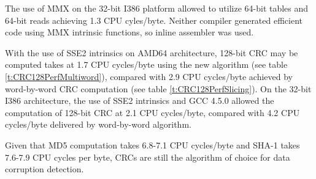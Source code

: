 \documentclass{article}
\begin{document}
The use of MMX on the 32-bit I386 platform allowed to utilize 64-bit tables
and 64-bit reads achieving 1.3 CPU cyles/byte. Neither compiler generated
efficient code using MMX intrinsic functions, so inline assembler was used.

With the use of SSE2 intrinsics on AMD64 architecture, 128-bit CRC may be
computed takes at 1.7 CPU cycles/byte using the new algorithm (see
table \ref{t:CRC128PerfMultiword}), compared with 2.9 CPU cycles/byte
achieved by word-by-word CRC computation (see table
\ref{t:CRC128PerfSlicing}). On the 32-bit I386 architecture, the use of SSE2
intrinsics and GCC 4.5.0 allowed the computation of 128-bit CRC at 2.1 CPU
cycles/byte, compared with 4.2 CPU cycles/byte delivered by
word-by-word algorithm.

Given that MD5 computation takes 6.8-7.1 CPU cycles/byte and SHA-1 takes
7.6-7.9 CPU cycles per byte, CRCs are still the algorithm of choice for
data corruption detection.






\appendix
\cleardoublepage
\end{document}
